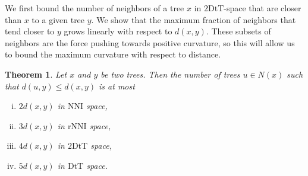 \documentclass{amsart}
\newtheorem{theorem}[lemma]{Theorem}
\theoremstyle{definition}
\newcommand{\dts}{\mathrm{2DtT}}
\newcommand{\nni}{\mathrm{NNI}}
\newcommand{\rnni}{\mathrm{rNNI}}
\newcommand{\dtt}{\mathrm{DtT}}
\begin{document}
We first bound the number of neighbors of a tree $x$ in $\dts$-space that are closer than $x$ to a given tree $y$.
We show that the maximum fraction of neighbors that tend closer to $y$ grows linearly with respect to $d(x,y)$.
These subsets of neighbors are the force pushing towards positive curvature, so this will allow us to bound the maximum curvature with respect to distance.

\begin{theorem}
\label{max_good_neighbours}
Let $x$ and $y$ be two trees.
Then the number of trees $u \in N(x)$ such that $d(u, y) \le d(x, y)$ is at most
\begin{enumerate}[(i)]
\item $2d(x,y)$ in $\nni$ space,
\item $3d(x,y)$ in $\rnni$ space,
\item $4d(x,y)$ in $\dts$ space,
\item $5d(x,y)$ in $\dtt$ space.
\end{enumerate}
\end{theorem}
\end{document}
